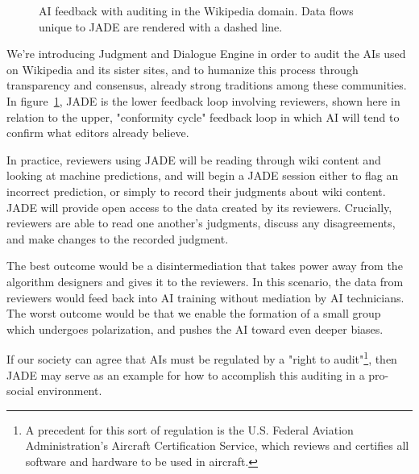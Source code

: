 \documentclass[format=sigconf]{acmart}
\begin{document}
\begin{figure}
\caption{AI feedback with auditing in the Wikipedia domain.  Data flows unique to JADE are rendered with a dashed line.}\label{fig:audited}
\end{figure}

We're introducing Judgment and Dialogue Engine in order to audit the AIs used on Wikipedia and its sister sites, and to humanize this process through transparency and consensus, already strong traditions among these communities.  In figure~\ref{fig:audited}, JADE is the lower feedback loop involving reviewers, shown here in relation to the upper, "conformity cycle" feedback loop in which AI will tend to confirm what editors already believe.

In practice, reviewers using JADE will be reading through wiki content and looking at machine predictions, and will begin a JADE session either to flag an incorrect prediction, or simply to record their judgments about wiki content.  JADE will provide open access to the data created by its reviewers.  Crucially, reviewers are able to read one another's judgments, discuss any disagreements, and make changes to the recorded judgment.

The best outcome would be a disintermediation that takes power away from the algorithm designers and gives it to the reviewers.  In this scenario, the data from reviewers would feed back into AI training without mediation by AI technicians.  The worst outcome would be that we enable the formation of a small group which undergoes polarization, and pushes the AI toward even deeper biases.

If our society can agree that AIs must be regulated by a "right to audit"\footnote{A precedent for this sort of regulation is the U.S. Federal Aviation Administration's Aircraft Certification Service, which reviews and certifies all software and hardware to be used in aircraft.}, then JADE may serve as an example for how to accomplish this auditing in a pro-social environment.


\end{document}
